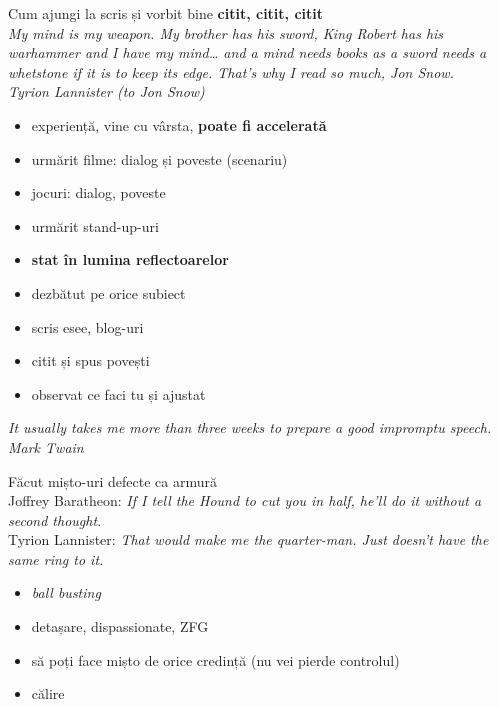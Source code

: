 \documentclass{simple}
\begin{document}
\begin{frame}{Cum ajungi la scris și vorbit bine}
  \centering
  \pause
  \textbf{citit, citit, citit}\\
  \vspace{3mm}
  \scriptsize
  \pause
  \textit{My mind is my weapon. My brother has his sword, King Robert has his warhammer and I have my mind\ldots{} and a mind needs books as a sword needs a whetstone if it is to keep its edge. That's why I read so much, Jon Snow.}\\
  \vspace{3mm}
  \hfill \textit{Tyrion Lannister (to Jon Snow)}
  \vspace{3mm}
  \begin{itemize}
    \pause
  \item experiență, vine cu vârsta, \textbf{poate fi accelerată}
    \pause
    \item urmărit filme: dialog și poveste (scenariu)
    \pause
    \item jocuri: dialog, poveste
    \pause
    \item urmărit stand-up-uri
    \pause
    \item \textbf{stat în lumina reflectoarelor}
    \pause
    \item dezbătut pe orice subiect
    \pause
    \item scris esee, blog-uri
    \pause
    \item citit și spus povești
    \pause
    \item observat ce faci tu și ajustat
  \end{itemize}
  \centering
  \vspace{3mm}
  \pause
  \textit{It usually takes me more than three weeks to prepare a good impromptu speech.}\\
  \vspace{3mm}
  \hfill \textit{Mark Twain}
\end{frame}

\begin{frame}{Făcut mișto-uri}
  \pause
  defecte ca armură\\
  \scriptsize
  \vspace{3mm}
  \pause
  \qquad Joffrey Baratheon: \textit{If I tell the Hound to cut you in half, he'll do it without a second thought.}\\
  \qquad Tyrion Lannister: \textit{That would make me the quarter-man. Just doesn't have the same ring to it.}\\
  \vspace{3mm}
  \normalsize
  \begin{itemize}
    \pause
    \item \textit{ball busting}
    \pause
    \item detașare, dispassionate, ZFG
    \pause
    \item să poți face mișto de orice credință (nu vei pierde controlul)
    \pause
    \item călire
  \end{itemize}
\end{frame}
\end{document}
